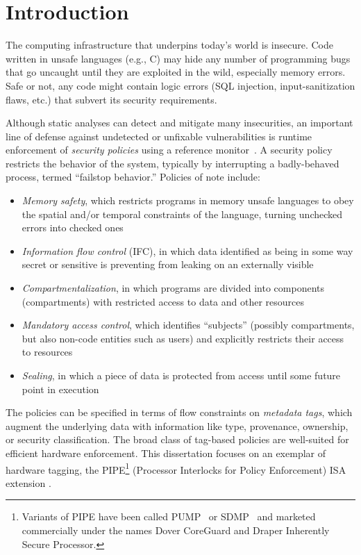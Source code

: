 \documentclass{report}
\begin{document}
\chapter{Introduction}

The computing infrastructure that underpins today's world is insecure. Code written
in unsafe languages (e.g., C) may hide any number of programming bugs that go uncaught
until they are exploited in the wild, especially memory errors. Safe or not, any code
might contain logic errors (SQL injection, input-sanitization flaws, etc.) that subvert
its security requirements.

Although static analyses can detect and mitigate many insecurities, an important line of
defense against undetected or unfixable vulnerabilities is runtime enforcement of
{\em security policies} using a reference monitor~\cite{Anderson72:PlanningStudy}.
A security policy restricts the behavior of the system, typically by interrupting
a badly-behaved process, termed ``failstop behavior.'' Policies of note include:

\begin{itemize}
\item {\em Memory safety}, which restricts programs in memory unsafe languages to obey
  the spatial and/or temporal constraints of the language, turning unchecked errors into
  checked ones
\item {\em Information flow control} (IFC), in which data identified as being in some way secret
  or sensitive is preventing from leaking on an externally visible
\item {\em Compartmentalization}, in which programs are divided into components (compartments)
  with restricted access to data and other resources
\item {\em Mandatory access control}, which identifies ``subjects'' (possibly compartments,
  but also non-code entities such as users) and explicitly restricts their access to resources
\item {\em Sealing}, in which a piece of data is protected from access until some future
  point in execution
\end{itemize}

The policies can be specified in terms of flow constraints on \emph{metadata tags},
which augment the underlying data with information like type, provenance, ownership, or
security classification. The broad class of tag-based policies are well-suited for efficient
hardware enforcement. This dissertation focuses on an exemplar of hardware tagging, the
PIPE\footnote{ Variants of PIPE have
been called PUMP~\cite{Dhawan+15} or SDMP~\cite{RoesslerD18} and marketed commercially
under the names Dover CoreGuard and Draper Inherently Secure Processor.}
(Processor Interlocks for Policy Enforcement) ISA extension \cite{Azevedo+16,Azevedo+15}.
\end{document}
